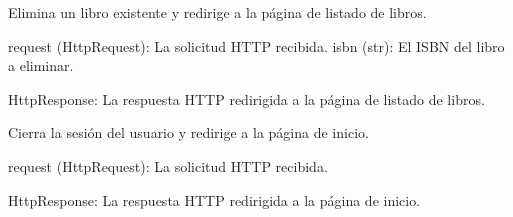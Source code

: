 \documentclass[letterpaper,10pt,spanish]{sphinxmanual}
\begin{document}

\begin{fulllineitems}
\label{\detokenize{modules/appejemplares:appejemplares.views.eliminar}}
\pysigstartsignatures
{}
\pysigstopsignatures
\sphinxAtStartPar
Elimina un libro existente y redirige a la página de listado de libros.
\begin{description}
\sphinxAtStartPar
request (HttpRequest): La solicitud HTTP recibida.
isbn (str): El ISBN del libro a eliminar.

\sphinxAtStartPar
HttpResponse: La respuesta HTTP redirigida a la página de listado de libros.

\end{description}

\end{fulllineitems}


\begin{fulllineitems}
\label{\detokenize{modules/appejemplares:appejemplares.views.exit}}
\pysigstartsignatures
{}
\pysigstopsignatures
\sphinxAtStartPar
Cierra la sesión del usuario y redirige a la página de inicio.
\begin{description}
\sphinxAtStartPar
request (HttpRequest): La solicitud HTTP recibida.

\sphinxAtStartPar
HttpResponse: La respuesta HTTP redirigida a la página de inicio.

\end{description}

\end{fulllineitems}

\end{document}
